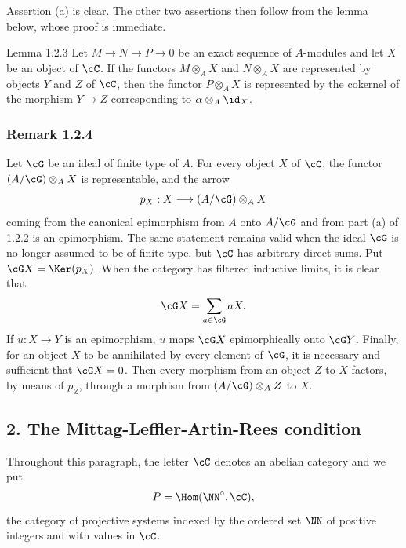 \begin{prooftext}[Proof]
Assertion (a) is clear. The other two assertions then follow from the lemma below, whose proof is immediate.
\end{prooftext}

\begin{statement}{Lemma 1.2.3}
Let $M\to N\to P\to0$ be an exact sequence of $A$-modules and let $X$ be an object of $\cC$. If the functors $M\otimes_A X$ and $N\otimes_A X$ are represented by objects $Y$ and $Z$ of $\cC$, then the functor $P\otimes_A X$ is represented by the cokernel of the morphism $Y\to Z$ corresponding to $\alpha\otimes_A\id_X$.
\end{statement}

\subsubsection*{Remark 1.2.4}
Let $\cG$ be an ideal of finite type of $A$. For every object $X$ of $\cC$, the functor $(A/\cG)\otimes_A X$ is representable, and the arrow
\[
p_X:X\longrightarrow (A/\cG)\otimes_A X
\]
coming from the canonical epimorphism from $A$ onto $A/\cG$ and from part (a) of 1.2.2 is an epimorphism. The same statement remains valid when the ideal $\cG$ is no longer assumed to be of finite type, but $\cC$ has arbitrary direct sums. Put $\cG X=\Ker(p_X)$. When the category has filtered inductive limits, it is clear that
\[
\cG X=\sum_{a\in\cG}aX.
\]
If $u:X\to Y$ is an epimorphism, $u$ maps $\cG X$ epimorphically onto $\cG Y$. Finally, for an object $X$ to be annihilated by every element of $\cG$, it is necessary and sufficient that $\cG X=0$. Then every morphism from an object $Z$ to $X$ factors, by means of $p_Z$, through a morphism from $(A/\cG)\otimes_A Z$ to $X$.

\subsection*{2. The Mittag-Leffler-Artin-Rees condition}
Throughout this paragraph, the letter $\cC$ denotes an abelian category and we put
\[
P=\Hom(\NN^\circ,\cC),
\]
the category of projective systems indexed by the ordered set $\NN$ of positive integers and with values in $\cC$.

